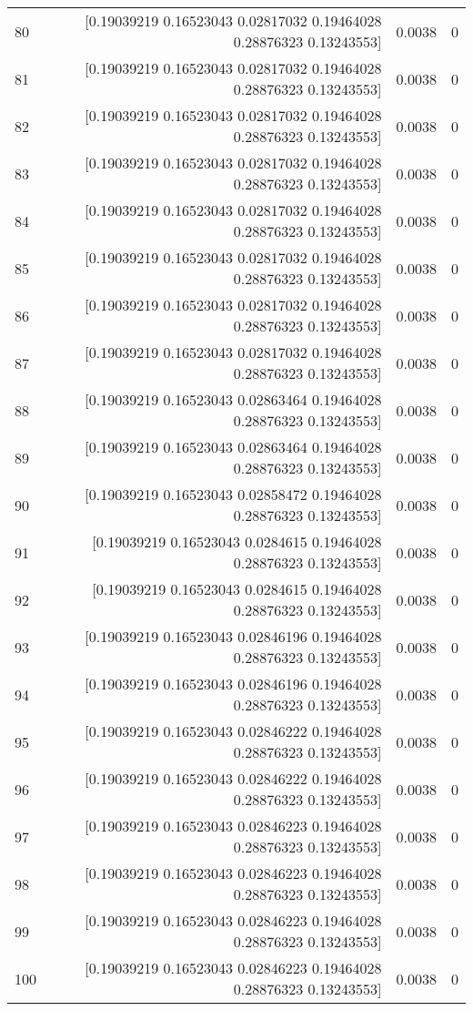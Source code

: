 \begin{longtable}{lrrr}
80 & [0.19039219 0.16523043 0.02817032 0.19464028 0.28876323 0.13243553] & 0.0038 & 0 \\
81 & [0.19039219 0.16523043 0.02817032 0.19464028 0.28876323 0.13243553] & 0.0038 & 0 \\
82 & [0.19039219 0.16523043 0.02817032 0.19464028 0.28876323 0.13243553] & 0.0038 & 0 \\
83 & [0.19039219 0.16523043 0.02817032 0.19464028 0.28876323 0.13243553] & 0.0038 & 0 \\
84 & [0.19039219 0.16523043 0.02817032 0.19464028 0.28876323 0.13243553] & 0.0038 & 0 \\
85 & [0.19039219 0.16523043 0.02817032 0.19464028 0.28876323 0.13243553] & 0.0038 & 0 \\
86 & [0.19039219 0.16523043 0.02817032 0.19464028 0.28876323 0.13243553] & 0.0038 & 0 \\
87 & [0.19039219 0.16523043 0.02817032 0.19464028 0.28876323 0.13243553] & 0.0038 & 0 \\
88 & [0.19039219 0.16523043 0.02863464 0.19464028 0.28876323 0.13243553] & 0.0038 & 0 \\
89 & [0.19039219 0.16523043 0.02863464 0.19464028 0.28876323 0.13243553] & 0.0038 & 0 \\
90 & [0.19039219 0.16523043 0.02858472 0.19464028 0.28876323 0.13243553] & 0.0038 & 0 \\
91 & [0.19039219 0.16523043 0.0284615  0.19464028 0.28876323 0.13243553] & 0.0038 & 0 \\
92 & [0.19039219 0.16523043 0.0284615  0.19464028 0.28876323 0.13243553] & 0.0038 & 0 \\
93 & [0.19039219 0.16523043 0.02846196 0.19464028 0.28876323 0.13243553] & 0.0038 & 0 \\
94 & [0.19039219 0.16523043 0.02846196 0.19464028 0.28876323 0.13243553] & 0.0038 & 0 \\
95 & [0.19039219 0.16523043 0.02846222 0.19464028 0.28876323 0.13243553] & 0.0038 & 0 \\
96 & [0.19039219 0.16523043 0.02846222 0.19464028 0.28876323 0.13243553] & 0.0038 & 0 \\
97 & [0.19039219 0.16523043 0.02846223 0.19464028 0.28876323 0.13243553] & 0.0038 & 0 \\
98 & [0.19039219 0.16523043 0.02846223 0.19464028 0.28876323 0.13243553] & 0.0038 & 0 \\
99 & [0.19039219 0.16523043 0.02846223 0.19464028 0.28876323 0.13243553] & 0.0038 & 0 \\
100 & [0.19039219 0.16523043 0.02846223 0.19464028 0.28876323 0.13243553] & 0.0038 & 0 \\

\end{longtable}
